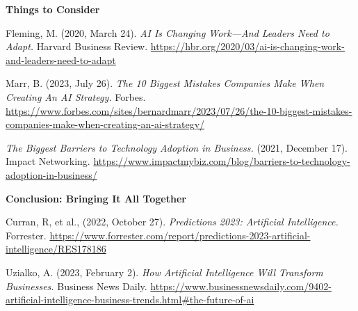 \documentclass[
]{article}
\begin{document}
\textbf{Things to Consider}

Fleming, M. (2020, March 24). \emph{AI Is Changing Work---And Leaders Need to Adapt.} Harvard Business Review. \url{https://hbr.org/2020/03/ai-is-changing-work-and-leaders-need-to-adapt}

Marr, B. (2023, July 26). \emph{The 10 Biggest Mistakes Companies Make When Creating An AI Strategy.} Forbes. \url{https://www.forbes.com/sites/bernardmarr/2023/07/26/the-10-biggest-mistakes-companies-make-when-creating-an-ai-strategy/}

\emph{The Biggest Barriers to Technology Adoption in Business.} (2021, December 17). Impact Networking. \url{https://www.impactmybiz.com/blog/barriers-to-technology-adoption-in-business/}

\textbf{Conclusion: Bringing It All Together}

Curran, R, et al., (2022, October 27). \emph{Predictions 2023: Artificial Intelligence.} Forrester. \url{https://www.forrester.com/report/predictions-2023-artificial-intelligence/RES178186}

Uzialko, A. (2023, February 2). \emph{How Artificial Intelligence Will Transform Businesses.} Business News Daily. \url{https://www.businessnewsdaily.com/9402-artificial-intelligence-business-trends.html\#the-future-of-ai}
\end{document}
